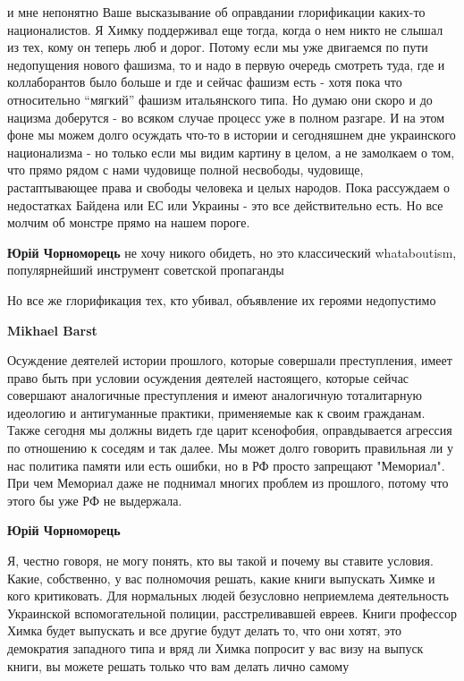 \begin{itemize}
\begin{itemize}
и мне непонятно Ваше высказывание об оправдании глорификации каких-то
националистов. Я Химку поддерживал еще тогда, когда о нем никто не слышал из
тех, кому он теперь люб и дорог. Потому если мы уже двигаемся по пути
недопущения нового фашизма, то и надо в первую очередь смотреть туда, где и
коллаборантов было больше и где и сейчас фашизм есть - хотя пока что
относительно \enquote{мягкий} фашизм итальянского типа. Но думаю они скоро и до нацизма
доберутся - во всяком случае процесс уже в полном разгаре. И на этом фоне мы
можем долго осуждать что-то в истории и сегодняшнем дне украинского
национализма - но только если мы видим картину в целом, а не замолкаем о том,
что прямо рядом с нами чудовище полной несвободы, чудовище, растаптывающее
права и свободы человека и целых народов. Пока рассуждаем о недостатках Байдена
или ЕС или Украины - это все действительно есть. Но все молчим об монстре прямо
на нашем пороге.

\textbf{Юрій Чорноморець} не хочу никого обидеть, но это классический whataboutism, популярнейший инструмент советской пропаганды

Но все же глорификация тех, кто убивал, объявление их героями недопустимо

\textbf{Mikhael Barst} 

Осуждение деятелей истории прошлого, которые совершали преступления, имеет
право быть при условии осуждения деятелей настоящего, которые сейчас совершают
аналогичные преступления и имеют аналогичную тоталитарную идеологию и
антигуманные практики, применяемые как к своим гражданам. Также сегодня мы
должны видеть где царит ксенофобия, оправдывается агрессия по отношению к
соседям и так далее. Мы может долго говорить правильная ли у нас политика
памяти или есть ошибки, но в РФ просто запрещают "Мемориал". При чем Мемориал
даже не поднимал многих проблем из прошлого, потому что этого бы уже РФ не
выдержала.

\textbf{Юрій Чорноморець} 

Я, честно говоря, не могу понять, кто вы такой и почему вы ставите условия.
Какие, собственно, у вас полномочия решать, какие книги выпускать Химке и кого
критиковать. Для нормальных людей безусловно неприемлема деятельность
Украинской вспомогательной полиции, расстреливавшей евреев. Книги профессор
Химка будет выпускать и все другие будут делать то, что они хотят, это
демократия западного типа и вряд ли Химка попросит у вас визу на выпуск книги,
вы можете решать только что вам делать лично самому


\end{itemize}
\end{itemize}
